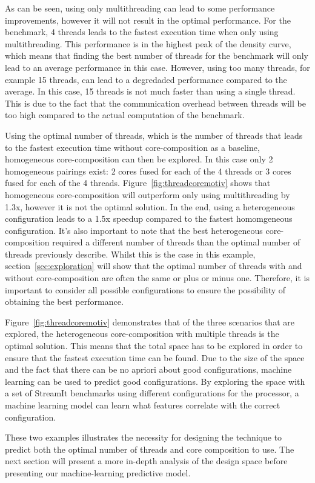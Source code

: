 As can be seen, using only multithreading can lead to some performance improvements, however it will not result in the optimal performance.
For the  benchmark, 4 threads leads to the fastest execution time when only using multithreading.
This performance is in the highest peak of the density curve, which means that finding the best number of threads for the benchmark will only lead to an average performance in this case.
However, using too many threads, for example 15 threads, can lead to a degredaded performance compared to the average.
In this case, 15 threads is not much faster than using a single thread.
This is due to the fact that the communication overhead between threads will be too high compared to the actual computation of the benchmark.

Using the optimal number of threads, which is the number of threads that leads to the fastest execution time without core-composition as a baseline, homogeneous core-composition can then be explored.
In this case only 2 homogeneous pairings exist: 2 cores fused for each of the 4 threads or 3 cores fused for each of the 4 threads.
Figure~\ref{fig:threadcoremotiv} shows that homogeneous core-composition will outperform only using multithreading by 1.3x, however it is not the optimal solution.
In the end, using a heterogeneous configuration leads to a 1.5x speedup compared to the fastest homomgeneous configuration.
It's also important to note that the best heterogeneous core-composition required a different number of threads than the optimal number of threads previously describe.
Whilst this is the case in this example, section~\ref{sec:exploration} will show that the optimal number of threads with and without core-composition are often the same or plus or minus one.
Therefore, it is important to consider all possible configurations to ensure the possibility of obtaining the best performance.

Figure~\ref{fig:threadcoremotiv} demonstrates that of the three scenarios that are explored, the heterogeneous core-composition with multiple threads is the optimal solution.
This means that the total space has to be explored in order to ensure that the fastest execution time can be found.
Due to the size of the space and the fact that there can be no apriori about good configurations, machine learning can be used to predict good configurations.
By exploring the space with a set of StreamIt benchmarks using different configurations for the processor, a machine learning model can learn what features correlate with the correct configuration.

These two examples illustrates the necessity for designing the technique to predict both the optimal number of threads and core composition to use.
The next section will present a more in-depth analysis of the design space before presenting our machine-learning predictive model.

